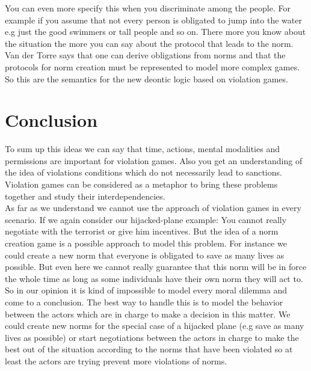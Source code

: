 \documentclass[conference]{hehe}
\begin{document}
You can even more specify this when you discriminate among the people. For example if you assume that not every person is obligated to jump into the water e.g just the good swimmers or tall people and so on. There more you know about the situation the more you can say about the protocol that leads to the norm.\\
Van der Torre says that one can derive obligations from norms and that the protocols for norm creation must be represented to model more complex games. So this are the semantics for the new deontic logic based on violation games.
\section{Conclusion}
To sum up this ideas we can say that time, actions, mental modalities and permissions are important for violation games. Also you get an understanding of the idea of violations conditions which do not necessarily lead to sanctions. Violation games can be considered as a metaphor to bring these problems together and study their interdependencies. \\
As far as we understand we cannot use the approach of violation games in every scenario. If we again consider our hijacked-plane example: You cannot really negotiate with the terrorist or give him incentives. But the idea of a norm creation game is a possible approach to model this problem. For instance we could create a new norm that everyone is obligated to save as many lives as possible. But even here we cannot really guarantee that this norm will be in force the whole time as long as some individuals have their own norm they will act to.\\
So in our opinion it is kind of impossible to model every moral dilemma and come to a conclusion. The best way to handle this is to model the behavior between the actors which are in charge to make a decision in this matter. We could create new norms for the special case of a hijacked plane (e.g save as many lives as possible) or start negotiations between the actors in charge to make the best out of the situation according to the norms that have been violated so at least the actors are trying prevent more violations of norms.\\
\end{document}
